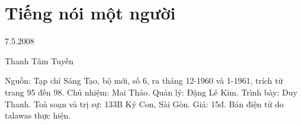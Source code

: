 \documentclass[../main.tex]{subfiles}
\begin{document}
\chapter{Tiếng nói một người}

\begin{metadata}

\begin{flushright}7.5.2008\end{flushright}

Thanh Tâm Tuyền

Nguồn: Tạp chí Sáng Tạo, bộ mới, số 6, ra tháng 12-1960 và 1-1961, trích từ trang 95 đến 98. Chủ nhiệm: Mai Thảo. Quản lý: Đặng Lê Kim. Trình bày: Duy Thanh. Toà soạn và trị sự: 133B Ký Con, Sài Gòn. Giá: 15đ. Bản điện tử do talawas thực hiện.

\end{metadata}
\end{document}
